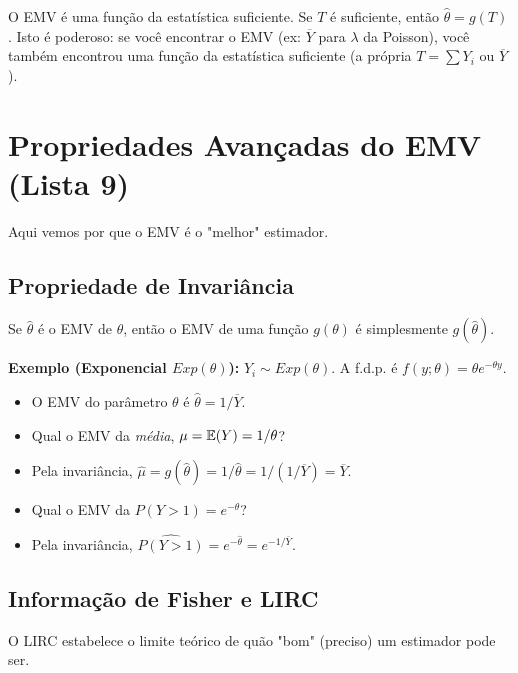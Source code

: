 \begin{propriedade}
O EMV é uma função da estatística suficiente. Se $T$ é suficiente, então $\hat{\theta} = g(T)$.
Isto é poderoso: se você encontrar o EMV (ex: $\overline{Y}$ para $\lambda$ da Poisson), você também encontrou uma função da estatística suficiente (a própria $T=\sum Y_i$ ou $\overline{Y}$).

\section{Propriedades Avançadas do EMV (Lista 9)}
\label{sec:assintotica}
Aqui vemos por que o EMV é o "melhor" estimador.

\subsection{Propriedade de Invariância}
\begin{teorema}[Invariância]
Se $\hat{\theta}$ é o EMV de $\theta$, então o EMV de uma função $g(\theta)$ é simplesmente $g(\hat{\theta})$.
\end{teorema}
\textbf{Exemplo (Exponencial $Exp(\theta)$):}
$Y_i \sim Exp(\theta)$. A f.d.p. é $f(y;\theta) = \theta e^{-\theta y}$.
\begin{itemize}
    \item O EMV do parâmetro $\theta$ é $\hat{\theta} = 1/\overline{Y}$.
    \item Qual o EMV da \textit{média}, $\mu = \mathbb{E}(Y) = 1/\theta$?
    \item Pela invariância, $\hat{\mu} = g(\hat{\theta}) = 1/\hat{\theta} = 1/(1/\overline{Y}) = \overline{Y}$.
    \item Qual o EMV da $P(Y > 1) = e^{-\theta}$?
    \item Pela invariância, $\widehat{P(Y>1)} = e^{-\hat{\theta}} = e^{-1/\overline{Y}}$.
\end{itemize}

\subsection{Informação de Fisher e LIRC}
O LIRC estabelece o limite teórico de quão "bom" (preciso) um estimador pode ser.


\end{propriedade}
